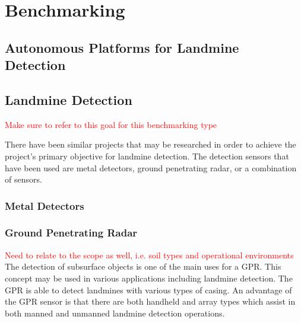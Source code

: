 \documentclass[main.tex]{subfiles}
\begin{document}
\chapter{Benchmarking}

\section{Autonomous Platforms for Landmine Detection}

\section{Landmine Detection}
\textcolor{red}{Make sure to refer to this goal for this benchmarking type}

There have been similar projects that may be researched in order to achieve the project's primary objective for landmine detection. The detection sensors that have been used are metal detectors, ground penetrating radar, or a combination of sensors.  

\subsection{Metal Detectors}

\subsection{Ground Penetrating Radar}
\textcolor{red}{Need to relate to the scope as well, i.e. soil types and operational environments\\}
The detection of subsurface objects is one of the main uses for a GPR. This concept may be used in various applications including landmine detection. The GPR is able to detect landmines with various types of casing. An advantage of the GPR sensor is that there are both handheld and array types which assist in both manned and unmanned landmine detection operations. 
\end{document}
